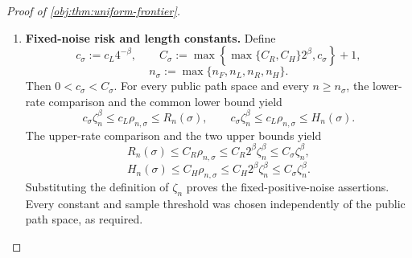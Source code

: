 \begin{proof}[Proof of \cref{obj:thm:uniform-frontier}]
\begin{enumerate}
\item \textbf{Fixed-noise risk and length constants.}
Define
\[
c_\sigma:=c_L4^{-\beta},
\qquad
C_\sigma:=
\max\left\{\max\{C_R,C_H\}2^\beta,c_\sigma\right\}+1,
\]
\[
n_\sigma:=\max\{n_F,n_L,n_R,n_H\}.
\]
Then \(0<c_\sigma<C_\sigma\). For every public path space and every \(n\ge n_\sigma\), the lower-rate comparison and the common lower bound yield
\[
c_\sigma\zeta_n^\beta
\le c_L\rho_{n,\sigma}\le R_n(\sigma),
\qquad
c_\sigma\zeta_n^\beta
\le c_L\rho_{n,\sigma}\le H_n(\sigma).
\]
The upper-rate comparison and the two upper bounds yield
\[
R_n(\sigma)
\le C_R\rho_{n,\sigma}
\le C_R2^\beta\zeta_n^\beta
\le C_\sigma\zeta_n^\beta,
\]
\[
H_n(\sigma)
\le C_H\rho_{n,\sigma}
\le C_H2^\beta\zeta_n^\beta
\le C_\sigma\zeta_n^\beta.
\]
Substituting the definition of \(\zeta_n\) proves the fixed-positive-noise assertions. Every constant and sample threshold was chosen independently of the public path space, as required.
\end{enumerate}
\end{proof}

